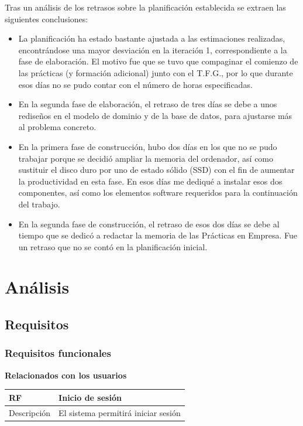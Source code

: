 \documentclass[twoside]{report}
\newcommand\addrow[2]{#1 &#2\\ }
\newcommand\addheading[2]{#1 &#2\\ \hline}
\newcommand\tabularhead{\begin{tabular}{lp{0.7\textwidth}}
\hline
}
\newenvironment{req}{\tabularhead}
{\hline\end{tabular}}
\begin{document}
Tras un análisis de los retrasos sobre la planificación establecida se extraen las siguientes conclusiones:
\begin{itemize}

\item La planificación ha estado bastante ajustada a las estimaciones realizadas, encontrándose una mayor desviación en la iteración 1, correspondiente a la fase de elaboración. El motivo fue que se tuvo que compaginar el comienzo de las prácticas (y formación adicional) junto con el T.F.G., por lo que durante esos días no se pudo contar con el número de horas especificadas.

\item En la segunda fase de elaboración, el retraso de tres días se debe a unos rediseños en el modelo de dominio y de la base de datos, para ajustarse más al problema concreto.

\item En la primera fase de construcción, hubo dos días en los que no se pudo trabajar porque se decidió ampliar la memoria del ordenador, así como sustituir el disco duro por uno de estado sólido (SSD) con el fin de aumentar la productividad en esta fase. En esos días me dediqué a instalar esos dos componentes, así como los elementos software requeridos para la continuación del trabajo.

\item En la segunda fase de construcción, el retraso de esos dos días se debe al tiempo que se dedicó a redactar la memoria de las Prácticas en Empresa. Fue un retraso que no se contó en la planificación inicial.

\end{itemize}


\section{Análisis}
\subsection{Requisitos}


\subsubsection{Requisitos funcionales}

\textbf{Relacionados con los usuarios}\\

\begin{req}
	\addheading{\textbf{RF\arabic{functionalRequirements}}}{Inicio de sesión}
	\addrow{Descripción}{El sistema permitirá iniciar sesión}
\end{req} \\
\end{document}
